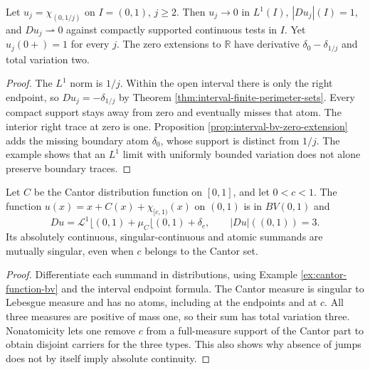 \begin{example}\label{ex:bv-boundary-layer-trace}
Let $u_j=\chi_{(0,1/j)}$ on $I=(0,1)$, $j\geq2$. Then $u_j\to0$ in $L^1(I)$, $|Du_j|(I)=1$, and $Du_j\rightharpoonup0$ against compactly supported continuous tests in $I$. Yet $u_j(0+)=1$ for every $j$. The zero extensions to $\mathbb R$ have derivative $\delta_0-\delta_{1/j}$ and total variation two.
\end{example}
\begin{proof}
The $L^1$ norm is $1/j$. Within the open interval there is only the right endpoint, so $Du_j=-\delta_{1/j}$ by Theorem \ref{thm:interval-finite-perimeter-sets}. Every compact support stays away from zero and eventually misses that atom. The interior right trace at zero is one. Proposition \ref{prop:interval-bv-zero-extension} adds the missing boundary atom $\delta_0$, whose support is distinct from $1/j$. The example shows that an $L^1$ limit with uniformly bounded variation does not alone preserve boundary traces.
\end{proof}

\begin{example}\label{ex:bv-three-derivative-types}
Let $C$ be the Cantor distribution function on $[0,1]$, and let $0<c<1$. The function $u(x)=x+C(x)+\chi_{[c,1)}(x)$ on $(0,1)$ is in $BV(0,1)$ and
\[
 Du=\mathcal L^1\lfloor(0,1)+\mu_C\lfloor(0,1)+\delta_c,
 \qquad |Du|((0,1))=3.
\]
Its absolutely continuous, singular-continuous and atomic summands are mutually singular, even when $c$ belongs to the Cantor set.
\end{example}
\begin{proof}
Differentiate each summand in distributions, using Example \ref{ex:cantor-function-bv} and the interval endpoint formula. The Cantor measure is singular to Lebesgue measure and has no atoms, including at the endpoints and at $c$. All three measures are positive of mass one, so their sum has total variation three. Nonatomicity lets one remove $c$ from a full-measure support of the Cantor part to obtain disjoint carriers for the three types. This also shows why absence of jumps does not by itself imply absolute continuity.
\end{proof}
